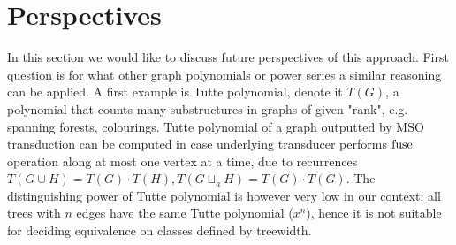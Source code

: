 \section{Perspectives}
In this section we would like to discuss future perspectives of this approach. First question is for what other graph polynomials or power series a similar reasoning can be applied. A first example is Tutte polynomial, denote it $T(G)$, a polynomial that counts many substructures in graphs of given "rank", e.g. spanning forests, colourings. Tutte polynomial of a graph outputted by MSO transduction can be computed in case underlying transducer performs $\operatorname{fuse}$ operation along at most one vertex at a time, due to recurrences $T(G \cup H) = T(G) \cdot T(H), T(G\sqcup_a H) = T(G) \cdot T(G)$. The distinguishing power of Tutte polynomial is however very low in our context: all trees with $n$ edges have the same Tutte polynomial ($x^n$), hence it is not suitable for deciding equivalence on classes defined by treewidth.

